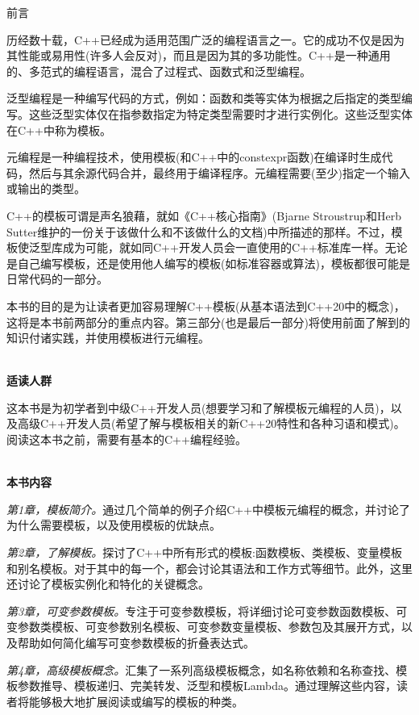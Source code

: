 \begin{flushright}
   前言
\end{flushright}

历经数十载，C++已经成为适用范围广泛的编程语言之一。它的成功不仅是因为其性能或易用性(许多人会反对)，而且是因为其的多功能性。C++是一种通用的、多范式的编程语言，混合了过程式、函数式和泛型编程。

泛型编程是一种编写代码的方式，例如：函数和类等实体为根据之后指定的类型编写。这些泛型实体仅在指参数指定为特定类型需要时才进行实例化。这些泛型实体在C++中称为模板。

元编程是一种编程技术，使用模板(和C++中的constexpr函数)在编译时生成代码，然后与其余源代码合并，最终用于编译程序。元编程需要(至少)指定一个输入或输出的类型。

C++的模板可谓是声名狼藉，就如《C++核心指南》(Bjarne Stroustrup和Herb Sutter维护的一份关于该做什么和不该做什么的文档)中所描述的那样。不过，模板使泛型库成为可能，就如同C++开发人员会一直使用的C++标准库一样。无论是自己编写模板，还是使用他人编写的模板(如标准容器或算法)，模板都很可能是日常代码的一部分。

本书的目的是为让读者更加容易理解C++模板(从基本语法到C++20中的概念)，这将是本书前两部分的重点内容。第三部分(也是最后一部分)将使用前面了解到的知识付诸实践，并使用模板进行元编程。

\hspace*{\fill} \\ %
\noindent
\textbf{适读人群}

这本书是为初学者到中级C++开发人员(想要学习和了解模板元编程的人员)，以及高级C++开发人员(希望了解与模板相关的新C++20特性和各种习语和模式)。阅读这本书之前，需要有基本的C++编程经验。

\hspace*{\fill} \\ %
\noindent
\textbf{本书内容}

\textit{第1章，模板简介。}通过几个简单的例子介绍C++中模板元编程的概念，并讨论了为什么需要模板，以及使用模板的优缺点。

\textit{第2章，了解模板。}探讨了C++中所有形式的模板:函数模板、类模板、变量模板和别名模板。对于其中的每一个，都会讨论其语法和工作方式等细节。此外，这里还讨论了模板实例化和特化的关键概念。

\textit{第3章，可变参数模板。}专注于可变参数模板，将详细讨论可变参数函数模板、可变参数类模板、可变参数别名模板、可变参数变量模板、参数包及其展开方式，以及帮助如何简化编写可变参数模板的折叠表达式。

\textit{第4章，高级模板概念。}汇集了一系列高级模板概念，如名称依赖和名称查找、模板参数推导、模板递归、完美转发、泛型和模板Lambda。通过理解这些内容，读者将能够极大地扩展阅读或编写的模板的种类。

